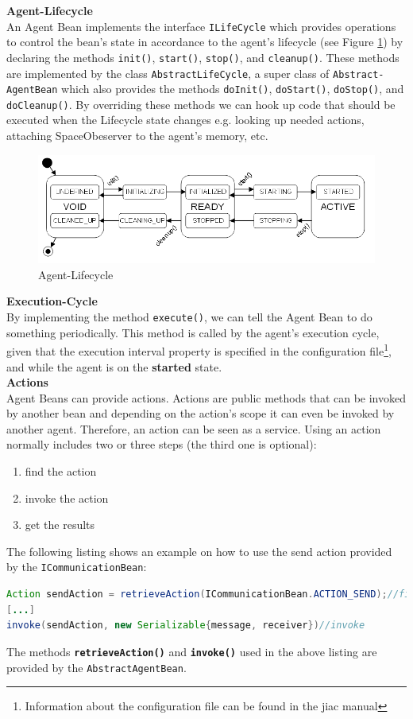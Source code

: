 \textbf{Agent-Lifecycle}\\
An Agent Bean implements the interface \texttt{ILifeCycle} which provides operations to control the bean's state in accordance to the agent's lifecycle (see Figure \ref{fig:lifecycle}) by declaring the methods \texttt{init()}, \texttt{start()}, \texttt{stop()}, and \texttt{cleanup()}. These methods are implemented by the class \texttt{AbstractLifeCycle}, a super class of \texttt{Abstract-AgentBean} which also provides the methods \texttt{doInit()}, \texttt{doStart()}, \texttt{doStop()}, and \texttt{doCleanup()}. By overriding these methods we can hook up code that should be executed when the Lifecycle state changes e.g. looking up needed actions, attaching SpaceObeserver to the agent's memory, etc.
\begin{figure}
	\centering
		\includegraphics[width=1.00\textwidth]{images/lifecycle.png}
		\caption{Agent-Lifecycle \cite{JIACMAN10}}
		\label{fig:lifecycle}
\end{figure}

\textbf{Execution-Cycle}\\
By implementing the method \texttt{execute()}, we can tell the Agent Bean to do something periodically. This method is called by the agent's execution cycle, given that the execution interval property is specified in the configuration file\footnote{Information about the configuration file can be found in the jiac manual\cite{JIACMAN10}}, and while the agent is on the \textbf{started} state.\\

\textbf{Actions}\\
Agent Beans can provide actions. Actions are public methods that can be invoked by another bean and depending on the action's scope it can even be invoked by another agent. Therefore, an action can be seen as a service. 
Using an action normally includes two or three steps (the third one is optional):
\begin{enumerate}
	\item find the action
	\item invoke the action
	\item get the results
\end{enumerate}
The following listing shows an example on how to use the send action provided by the \texttt{ICommunicationBean}:
\begin{lstlisting}[language = Java, caption = Using an Action]
Action sendAction = retrieveAction(ICommunicationBean.ACTION_SEND);//find action
[...]
invoke(sendAction, new Serializable{message, receiver})//invoke
\end{lstlisting}
The methods \textbf{\texttt{retrieveAction()}} and \textbf{\texttt{invoke()}} used in the above listing are provided  by the \texttt{AbstractAgentBean}.\\

